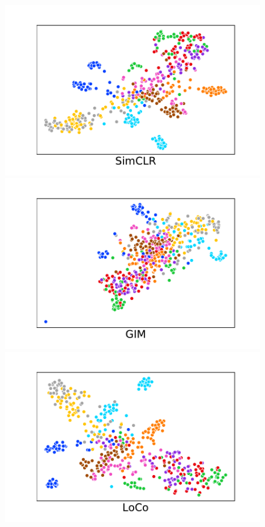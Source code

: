 \else
    \begin{figure}[htbp]
    \centering
    \begin{minipage}[t]{0.31\linewidth}
    \includegraphics[width=1\linewidth, trim={1.9cm 0 1.5cm 0}, clip]{figures/simclr_tsne.pdf}
    \end{minipage}
    \hfill
    \begin{minipage}[t]{0.31\linewidth}
    \includegraphics[width=1\linewidth, trim={1.9cm 0 1.5cm 0}, clip]{figures/gim_tsne.pdf}
    \end{minipage}
    \hfill
    \begin{minipage}[t]{0.31\linewidth}
    \includegraphics[width=1\linewidth, trim={1.9cm 0 1.5cm 0}, clip]{figures/loco_tsne.pdf}	

\end{minipage}
\end{figure}
